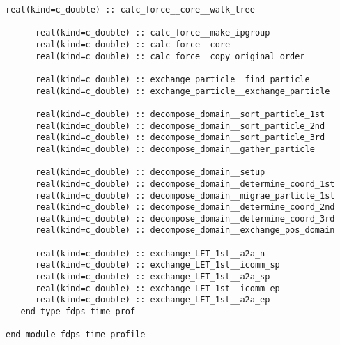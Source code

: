 \begin{lstlisting}[caption=Time profile types (Fortran),label=listing:time_profile_types]
      real(kind=c_double) :: calc_force__core__walk_tree                                           
                                                                                                   
      real(kind=c_double) :: calc_force__make_ipgroup                                              
      real(kind=c_double) :: calc_force__core                                                      
      real(kind=c_double) :: calc_force__copy_original_order                                       
                                                                                                   
      real(kind=c_double) :: exchange_particle__find_particle                                       
      real(kind=c_double) :: exchange_particle__exchange_particle

      real(kind=c_double) :: decompose_domain__sort_particle_1st
      real(kind=c_double) :: decompose_domain__sort_particle_2nd
      real(kind=c_double) :: decompose_domain__sort_particle_3rd
      real(kind=c_double) :: decompose_domain__gather_particle

      real(kind=c_double) :: decompose_domain__setup
      real(kind=c_double) :: decompose_domain__determine_coord_1st
      real(kind=c_double) :: decompose_domain__migrae_particle_1st
      real(kind=c_double) :: decompose_domain__determine_coord_2nd
      real(kind=c_double) :: decompose_domain__determine_coord_3rd
      real(kind=c_double) :: decompose_domain__exchange_pos_domain

      real(kind=c_double) :: exchange_LET_1st__a2a_n
      real(kind=c_double) :: exchange_LET_1st__icomm_sp
      real(kind=c_double) :: exchange_LET_1st__a2a_sp
      real(kind=c_double) :: exchange_LET_1st__icomm_ep
      real(kind=c_double) :: exchange_LET_1st__a2a_ep
   end type fdps_time_prof

end module fdps_time_profile  
\end{lstlisting}

